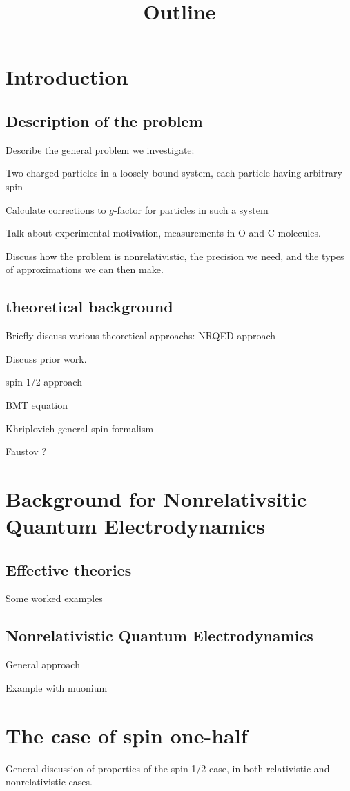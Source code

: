 \documentclass[12pt]{article}
\title{ Outline}
\author{}
\begin{document}
\maketitle

\section{Introduction}
\subsection{ Description of the problem}
Describe the general problem we investigate: 

	Two charged particles in a loosely bound system, each particle having arbitrary spin

	Calculate corrections to $g$-factor for particles in such a system

Talk about experimental motivation, measurements in O and C molecules.

Discuss how the problem is nonrelativistic, the precision we need, and the types of approximations we can then make.

\subsection{theoretical background}
Briefly discuss various theoretical approachs:
NRQED approach

Discuss prior work.

spin 1/2 approach

BMT equation

Khriplovich general spin formalism

Faustov ?


\section{Background for Nonrelativsitic Quantum Electrodynamics}
\subsection{Effective theories}
Some worked examples
\subsection{Nonrelativistic Quantum Electrodynamics}
General approach

Example with muonium


\section{The case of spin one-half}
General discussion of properties of the spin 1/2 case, in both relativistic and nonrelativistic cases.
\end{document}
